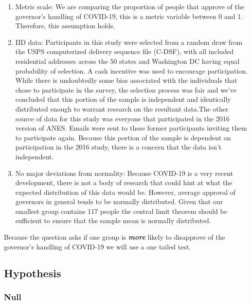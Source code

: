 \documentclass[
]{article}
\begin{document}
\begin{enumerate}
\def\labelenumi{\arabic{enumi})}
\item
  Metric scale: We are comparing the proportion of people that approve
  of the governor's handling of COVID-19, this is a metric variable
  between 0 and 1. Therefore, this assumption holds.
\item
  IID data: Participants in this study were selected from a random draw
  from the USPS computerized delivery sequence file (C-DSF), with all
  included residential addresses across the 50 states and Washington DC
  having equal probability of selection. A cash incentive was used to
  encourage participation. While there is undoubtedly some bias
  associated with the individuals that chose to participate in the
  survey, the selection process was fair and we've concluded that this
  portion of the sample is independent and identically distributed
  enough to warrant research on the resultant data.\n The other source
  of data for this study was everyone that participated in the 2016
  version of ANES. Emails were sent to these former participants
  inviting them to participate again. Because this portion of the sample
  is dependent on participation in the 2016 study, there is a concern
  that the data isn't independent.
\item
  No major deviations from normality: Because COVID-19 is a very recent
  development, there is not a body of research that could hint at what
  the expected distribution of this data would be. However, average
  approval of governors in general tends to be normally distributed.
  Given that our smallest group contains 117 people the central limit
  theorem should be sufficient to ensure that the sample mean is
  normally distributed.
\end{enumerate}

Because the question asks if one group is \textbf{\emph{more}} likely to
disapprove of the governor's handling of COVID-19 we will use a one
tailed test.

\hypertarget{hypothesis}{%
\subsection{Hypothesis}\label{hypothesis}}

\hypertarget{null}{%
\subsubsection{Null}\label{null}}
\end{document}
